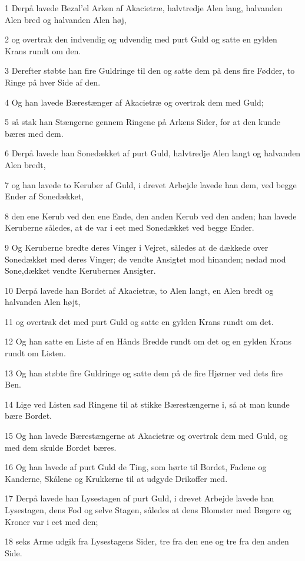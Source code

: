 \par 1 Derpå lavede Bezal'el Arken af Akacietræ, halvtredje Alen lang, halvanden Alen bred og halvanden Alen høj,
\par 2 og overtrak den indvendig og udvendig med purt Guld og satte en gylden Krans rundt om den.
\par 3 Derefter støbte han fire Guldringe til den og satte dem på dens fire Fødder, to Ringe på hver Side af den.
\par 4 Og han lavede Bærestænger af Akacietræ og overtrak dem med Guld;
\par 5 så stak han Stængerne gennem Ringene på Arkens Sider, for at den kunde bæres med dem.
\par 6 Derpå lavede han Sonedækket af purt Guld, halvtredje Alen langt og halvanden Alen bredt,
\par 7 og han lavede to Keruber af Guld, i drevet Arbejde lavede han dem, ved begge Ender af Sonedækket,
\par 8 den ene Kerub ved den ene Ende, den anden Kerub ved den anden; han lavede Keruberne således, at de var i eet med Sonedækket ved begge Ender.
\par 9 Og Keruberne bredte deres Vinger i Vejret, således at de dækkede over Sonedækket med deres Vinger; de vendte Ansigtet mod hinanden; nedad mod Sone,dækket vendte Kerubernes Ansigter.
\par 10 Derpå lavede han Bordet af Akacietræ, to Alen langt, en Alen bredt og halvanden Alen højt,
\par 11 og overtrak det med purt Guld og satte en gylden Krans rundt om det.
\par 12 Og han satte en Liste af en Hånds Bredde rundt om det og en gylden Krans rundt om Listen.
\par 13 Og han støbte fire Guldringe og satte dem på de fire Hjørner ved dets fire Ben.
\par 14 Lige ved Listen sad Ringene til at stikke Bærestængerne i, så at man kunde bære Bordet.
\par 15 Og han lavede Bærestængerne at Akacietræ og overtrak dem med Guld, og med dem skulde Bordet bæres.
\par 16 Og han lavede af purt Guld de Ting, som hørte til Bordet, Fadene og Kanderne, Skålene og Krukkerne til at udgyde Drikoffer med.
\par 17 Derpå lavede han Lysestagen af purt Guld, i drevet Arbejde lavede han Lysestagen, dens Fod og selve Stagen, således at dens Blomster med Bægere og Kroner var i eet med den;
\par 18 seks Arme udgik fra Lysestagens Sider, tre fra den ene og tre fra den anden Side.

